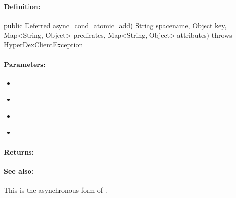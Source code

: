 \pagebreak
\subsubsection{}
\label{api:java:async_cond_atomic_add}


\paragraph{Definition:}
\begin{javacode}
public Deferred async_cond_atomic_add(
        String spacename,
        Object key,
        Map<String, Object> predicates,
        Map<String, Object> attributes) throws HyperDexClientException
\end{javacode}

\paragraph{Parameters:}
\begin{itemize}[noitemsep]
\item {}\\

\item {}\\

\item {}\\

\item {}\\

\end{itemize}

\paragraph{Returns:}


\paragraph{See also:}  This is the asynchronous form of .

\pagebreak
